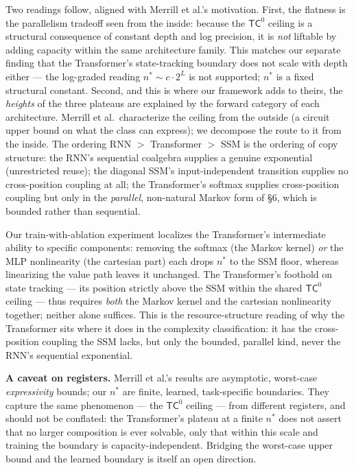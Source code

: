 \documentclass[a4paper,11pt]{article}
\begin{document}
Two readings follow, aligned with Merrill et al.'s motivation. First,
the flatness is the parallelism tradeoff seen from the inside: because
the \(\mathsf{TC}^0\) ceiling is a structural consequence of constant
depth and log precision, it is \emph{not} liftable by adding capacity
within the same architecture family. This matches our separate finding
that the Transformer's state-tracking boundary does not scale with depth
either --- the log-graded reading \(n^* \sim c\cdot 2^L\) is not
supported; \(n^*\) is a fixed structural constant. Second, and this is
where our framework adds to theirs, the \emph{heights} of the three
plateaus are explained by the forward category of each architecture.
Merrill et al.~characterize the ceiling from the outside (a circuit
upper bound on what the class can express); we decompose the route to it
from the inside. The ordering RNN \(>\) Transformer \(>\) SSM is the
ordering of copy structure: the RNN's sequential coalgebra supplies a
genuine exponential (unrestricted reuse); the diagonal SSM's
input-independent transition supplies no cross-position coupling at all;
the Transformer's softmax supplies cross-position coupling but only in
the \emph{parallel}, non-natural Markov form of §6, which is bounded
rather than sequential.

Our train-with-ablation experiment localizes the Transformer's
intermediate ability to specific components: removing the softmax (the
Markov kernel) \emph{or} the MLP nonlinearity (the cartesian part) each
drops \(n^*\) to the SSM floor, whereas linearizing the value path
leaves it unchanged. The Transformer's foothold on state tracking ---
its position strictly above the SSM within the shared \(\mathsf{TC}^0\)
ceiling --- thus requires \emph{both} the Markov kernel and the
cartesian nonlinearity together; neither alone suffices. This is the
resource-structure reading of why the Transformer sits where it does in
the complexity classification: it has the cross-position coupling the
SSM lacks, but only the bounded, parallel kind, never the RNN's
sequential exponential.

\textbf{A caveat on registers.} Merrill et al.'s results are asymptotic,
worst-case \emph{expressivity} bounds; our \(n^*\) are finite, learned,
task-specific boundaries. They capture the same phenomenon --- the
\(\mathsf{TC}^0\) ceiling --- from different registers, and should not
be conflated: the Transformer's plateau at a finite \(n^*\) does not
assert that no larger composition is ever solvable, only that within
this scale and training the boundary is capacity-independent. Bridging
the worst-case upper bound and the learned boundary is itself an open direction.
\end{document}
